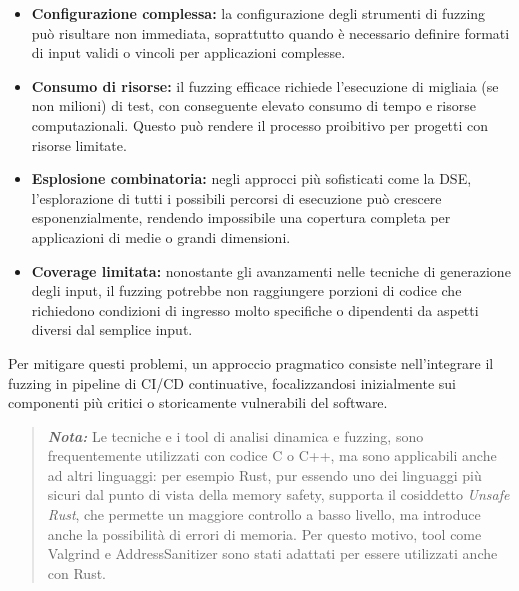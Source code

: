 \begin{itemize}
  \item \textbf{Configurazione complessa:} la configurazione degli strumenti di
    fuzzing può risultare non immediata, soprattutto quando è necessario definire
    formati di input validi o vincoli per applicazioni complesse.

  \item \textbf{Consumo di risorse:} il fuzzing efficace richiede l'esecuzione
    di migliaia (se non milioni) di test, con conseguente elevato consumo di tempo
    e risorse computazionali. Questo può rendere il processo proibitivo per
    progetti con risorse limitate.

  \item \textbf{Esplosione combinatoria:} negli approcci più sofisticati come la
    DSE, l'esplorazione di tutti i possibili percorsi di esecuzione può crescere
    esponenzialmente, rendendo impossibile una copertura completa per
    applicazioni di medie o grandi dimensioni.

  \item \textbf{Coverage limitata:} nonostante gli avanzamenti nelle tecniche di
    generazione degli input, il fuzzing potrebbe non raggiungere porzioni di codice
    che richiedono condizioni di ingresso molto specifiche o dipendenti da aspetti
    diversi dal semplice input.
\end{itemize}

Per mitigare questi problemi, un approccio pragmatico consiste nell'integrare il
fuzzing in pipeline di CI/CD continuative, focalizzandosi inizialmente sui componenti
più critici o storicamente vulnerabili del software.

\noindent

\begin{quote}
  \textbf{\textit{Nota:}} Le tecniche e i tool di analisi dinamica e fuzzing, sono
  frequentemente utilizzati con codice C o C++, ma sono applicabili anche ad
  altri linguaggi: per esempio Rust, pur essendo uno dei linguaggi più sicuri
  dal punto di vista della memory safety, supporta il cosiddetto \textit{Unsafe
  Rust}\footnotemark, che permette un maggiore controllo a basso livello, ma introduce
  anche la possibilità di errori di memoria. Per questo motivo, tool come Valgrind
  e AddressSanitizer sono stati adattati per essere utilizzati anche con Rust.~\cite{valgrind_rust}~\cite{rust_manual_san}
\end{quote}


